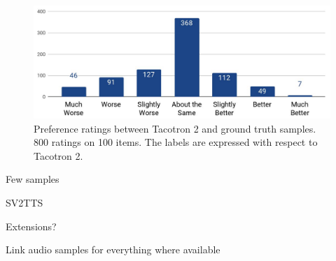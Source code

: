 \documentclass[a4paper, oneside]{article}
\begin{document}
\begin{figure}[h]
	\centering
	\includegraphics[width=.8\linewidth]{images/tacotron2_results.png}
	\caption{Preference ratings between Tacotron 2 and ground truth samples. 800 ratings on 100 items. The labels are expressed with respect to Tacotron 2.}
	\label{tacotron2_results}
\end{figure}


\color{red}
Few samples

SV2TTS

Extensions?

Link audio samples for everything where available
\color{black}



\color{red}\color{black}

\clearpage

 


























\end{document}
